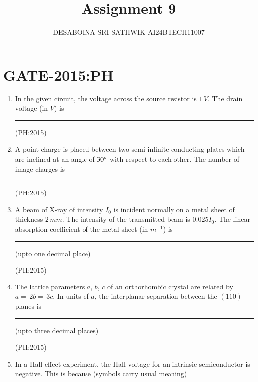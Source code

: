 \documentclass[journal,12pt,onecolumn]{IEEEtran}
\theoremstyle{remark}
\begin{document}

\vspace{3cm}

\title{Assignment 9}
\author{DESABOINA SRI SATHWIK-AI24BTECH11007}
\maketitle
\bigskip

\section*{GATE-2015:PH}
\begin{enumerate}
	\item
		In the given circuit, the voltage across the source resistor is $1 \, V$. The drain voltage (in $V$) is \rule{2cm}{0.4pt}

		\hfill{(PH:2015)}
		\begin{center}
			
		\end{center}
		\vspace{0.5cm}
	\item
		A point charge is placed between two semi-infinite conducting plates which are inclined at an angle of $30\degree$ with respect to each other. The number of image charges is  \rule{2.5cm}{0.4pt}

		\hfill{(PH:2015)}
		\vspace{0.5cm}
	\item 
		A beam of X-ray of intensity $I_0$ is incident normally on a metal sheet of thickness $2 \, mm$. The intensity of the transmitted beam is $0.025I_0$. The linear absorption coefficient of the metal sheet (in $m^{-1}$) is \rule{2.5cm}{0.4pt} (upto one decimal place)

		\hfill{(PH:2015)}
		\vspace{0.5cm}
		\item
			The lattice parameters $a$, $b$, $c$ of an orthorhombic crystal are related by $a=\, 2b= \, 3c$. In units of $a$, the interplanar separation between the $(110)$ planes is \rule{2cm}{0.4pt} (upto three decimal places)

			\hfill{(PH:2015)}
			\vspace{0.5cm}
		\item
			In a Hall effect experiment, the Hall voltage for an intrinsic semiconductor is negative. This is because (symbols carry usual meaning)


\end{enumerate}
\end{document}
